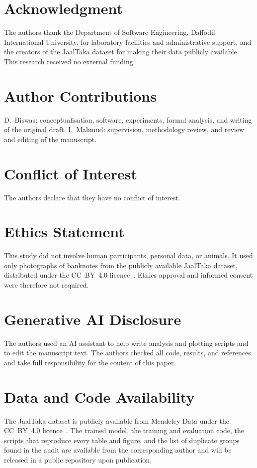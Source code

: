 \documentclass[journal]{IEEEtran}
\begin{document}
\section*{Acknowledgment}
The authors thank the Department of Software Engineering, Daffodil International
University, for laboratory facilities and administrative support, and the creators of
the JaalTaka dataset for making their data publicly available. This research received
no external funding.

\section*{Author Contributions}
D.~Biswas: conceptualisation, software, experiments, formal analysis, and writing of the
original draft. I.~Mahmud: supervision, methodology review, and review and editing of
the manuscript.

\section*{Conflict of Interest}
The authors declare that they have no conflict of interest.

\section*{Ethics Statement}
This study did not involve human participants, personal data, or animals. It used only
photographs of banknotes from the publicly available JaalTaka dataset, distributed under
the CC~BY~4.0 licence~\cite{jaaltaka_data}. Ethics approval and informed consent were
therefore not required.

\section*{Generative AI Disclosure}
The authors used an AI assistant to help write analysis and plotting scripts and to
edit the manuscript text. The authors checked all code, results, and references and take
full responsibility for the content of this paper.

\section*{Data and Code Availability}
The JaalTaka dataset is publicly available from Mendeley Data under the CC~BY~4.0
licence~\cite{jaaltaka_data}. The trained model, the training and evaluation code, the
scripts that reproduce every table and figure, and the list of duplicate groups found in
the audit are available from the corresponding author and will be released in a public
repository upon publication.
\end{document}
